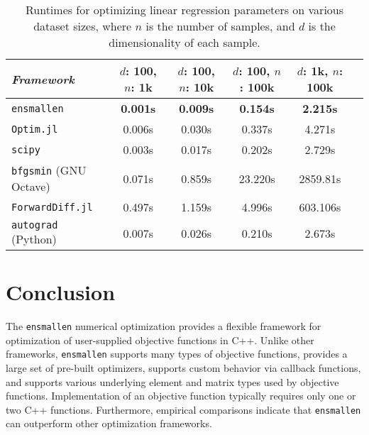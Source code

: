 \documentclass[twoside,11pt]{article}
\begin{document}
\begin{table}[t!]
{\small
\centering
\begin{tabular}{lccccc}
\toprule
{\em Framework} & $d$: 100, $n$: 1k & $d$: 100, $n$: 10k & $d$: 100, $n$:
100k & $d$: 1k, $n$: 100k \\
\midrule
\texttt{ensmallen} & {\bf 0.001s} & {\bf 0.009s} & {\bf 0.154s} & {\bf 2.215s} \\
\texttt{Optim.jl} & 0.006s & 0.030s & 0.337s & 4.271s \\
\texttt{scipy} & 0.003s & 0.017s & 0.202s & 2.729s \\
\texttt{bfgsmin} (GNU Octave) & 0.071s & 0.859s & 23.220s & 2859.81s\\
\texttt{ForwardDiff.jl} & 0.497s & 1.159s & 4.996s & 603.106s \\
\texttt{autograd} (Python) & 0.007s & 0.026s & 0.210s & 2.673s \\
\bottomrule
\end{tabular}
\vspace*{-0.4em}
\caption{
Runtimes for optimizing linear regression parameters on various dataset sizes,
where $n$ is the number of samples,
and $d$ is the dimensionality of each sample.
}
\label{tab:lbfgs}
}
\vspace*{-2.2em}
\end{table}


\section{Conclusion}
\label{sec:conclusion}

The {\tt ensmallen} numerical optimization provides a flexible framework
for optimization of user-supplied objective functions in C++.
Unlike other frameworks, {\tt ensmallen} supports many types of objective functions,
provides a large set of pre-built optimizers,
supports custom behavior via callback functions,
and supports various underlying element and matrix types used by objective functions.
Implementation of an objective function typically requires only one or two C++ functions.
Furthermore, empirical comparisons indicate that {\tt ensmallen} can outperform other optimization frameworks.
\end{document}
